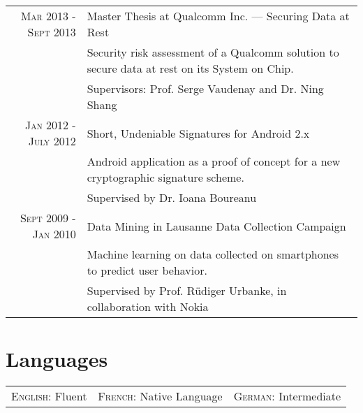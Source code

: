 \documentclass[a4paper,10pt]{article} %
\newcommand\Bot{\rule[-1.2ex]{0pt}{0pt}} %
\begin{document}
\begin{tabular}{rl}
    \textsc{Mar 2013 - Sept 2013} & Master Thesis at Qualcomm Inc. --- Securing Data at Rest \\
                                  & \footnotesize{Security risk assessment of a
Qualcomm solution to secure data at rest on its System on Chip.} \\
                                  & \footnotesize{Supervisors: Prof. Serge Vaudenay and
Dr. Ning Shang}\Bot\\
    

    \textsc{Jan 2012 - July 2012} & Short, Undeniable Signatures for Android 2.x\\
                                  & \footnotesize{Android application as a proof
                                      of concept for a new cryptographic signature
                                      scheme.} \\
                                  & \footnotesize{Supervised by Dr. Ioana Boureanu}\Bot\\

    \textsc{Sept 2009 - Jan 2010} & Data Mining in Lausanne Data Collection Campaign\\
                                  & \footnotesize{Machine learning on data collected on
                                      smartphones to predict user behavior.}\\
                                  & \footnotesize{Supervised by Prof. R\"{u}diger Urbanke, in
                                      collaboration with Nokia}\\
\end{tabular}


\section{Languages}

\begin{center}
\begin{tabular}{lcr}
\textsc{English:} Fluent & \textsc{French:} Native Language & \textsc{German:} Intermediate\\
\end{tabular}
\end{center}
\end{document}
